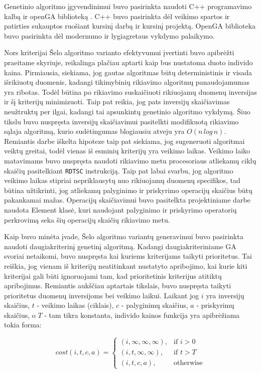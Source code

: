 \documentclass{VUMIFInfBakalaurinis}
\begin{document}
Genetinio algoritmo įgyvendinimui buvo pasirinkta naudoti C++ programavimo kalbą ir openGA biblioteką \cite{mohammadi2017openga}.
C++ buvo pasirinkta dėl veikimo spartos ir patirties sukauptos ruošiant kursinį darbą ir kursinį projektą.
OpenGA biblioteka buvo pasirinkta dėl modernumo ir lygiagretaus vykdymo palaikymo.

Nors kriterijai Šelo algoritmo varianto efektyvumui įvertinti buvo apibrėžti praeitame skyriuje,
reikalinga plačiau aptarti kaip bus nustatoma duoto individo kaina.
Pirmiausia, siekiama, jog gautas algoritmas būtų deterministinis ir visada išrikiuotų duomenis, kadangi tikimybinių rikiavimo algoritmų panaudojamumas yra ribotas.
Todėl būtina po rikiavimo suskaičiuoti rikiuojamų duomenų inversijas ir šį kriterijų minimizuoti.
Taip pat reikia, jog pats inversijų skaičiavimas neužtruktų per ilgai, kadangi tai apsunkintų genetinio algoritmo vykdymą.
Šiuo tikslu buvo nuspręsta inversijų skaičiavimui pasitelkti modifikuotą rikiavimo sąlaja algoritmą, kurio sudėtingumas blogiausiu atveju yra $O(n\,log\,n)$.
Remiantis darbe iškelta hipoteze taip pat siekiama, jog sugeneruoti algoritmai veiktų greitai, todėl
vienas iš esminių kriterijų yra veikimo laikas.
Veikimo laiko matavimams buvo nuspręsta naudoti rikiavimo metu procesoriaus atliekamų ciklų skaičių pasitelkiant \verb|RDTSC| instrukciją.
Taip pat labai svarbu, jog algoritmo veikimo laikas stipriai nepriklausytų nuo rikiuojamų duomenų specifikos, tad 
būtina užtikrinti, jog atliekamų palyginimo ir priskyrimo operacijų skaičius būtų pakankamai mažas.
Operacijų skaičiavimui buvo pasitelkta projektiniame darbe naudota Element klasė, kuri naudojant palyginimo ir priskyrimo operatorių
perkrovimą seka šių operacijų skaičių rikiavimo metu.

Kaip buvo minėta įvade, Šelo algoritmo variantų generavimui buvo pasirinkta naudoti daugiakriterinį genetinį algoritmą.
Kadangi daugiakriteriniame GA svoriai netaikomi, buvo nuspręsta kai kuriems kriterijams taikyti prioritetus.
Tai reiškia, jog vienam iš kriterijų neatitinkant nustatyto apribojimo, kai kurie kiti kriterijai gali būti ignoruojami
tam, kad prioritetinis kriterijus atitiktų apribojimus.
Remiantis aukščiau aptartais tikslais, buvo nuspręsta taikyti prioritetus duomenų inversijoms bei veikimo laikui.
Laikant jog $i$ yra inversijų skaičius, $t$ - veikimo laikas (ciklais),
$c$ - palyginimų skaičius, $a$ - priskyrimų skaičius, o $T$ - tam tikra konstanta,
individo kainos funkcija yra apibrėžiama tokia forma:

\[
  cost(i, t, c, a)=
  \begin{cases}
    (i, \infty, \infty, \infty),& \text{if } i > 0\\
    (i, t, \infty, \infty),& \text{if } t > T\\
    (i, t, c, a), & \text{otherwise}
  \end{cases}
\]
\end{document}
